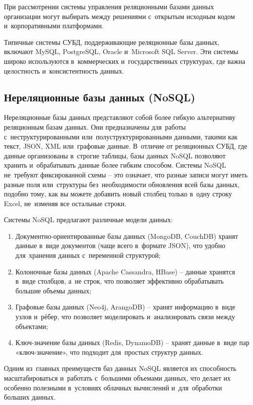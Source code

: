 \documentclass{ou}
\begin{document}
При рассмотрении системы управления реляционными базами данных организации могут выбирать между решениями с~открытым исходным кодом и~корпоративными платформами.

Типичные системы СУБД, поддерживающие реляционные базы данных, включают MySQL, PostgreSQL, Oracle и~Microsoft SQL Server. Эти системы широко используются в~коммерческих и~государственных структурах, где важна целостность и~консистентность данных.

\subsection{Нереляционные базы данных (NoSQL)}
Нереляционные базы данных представляют собой более гибкую альтернативу реляционным базам данных. Они предназначены для~работы с~неструктурированными или~полуструктурированными данными, такими как текст, JSON, XML или~графовые данные. В~отличие от реляционных СУБД, где данные организованы в~строгие таблицы, базы данных NoSQL позволяют хранить и~обрабатывать данные более гибким способом. Системы NoSQL не~требуют фиксированной схемы -- это означает, что разные записи могут иметь разные поля или~структуры без~необходимости обновления всей базы данных, подобно тому, как вы можете добавить новый столбец только в~одну строку Excel, не~изменяя все остальные строки.

Системы NoSQL предлагают различные модели данных: 
\begin{enumerate}[leftmargin=0em, itemindent=3.75em, nosep, label=\arabic*)]
\item Документно-ориентированные базы данных (MongoDB, CouchDB) хранят данные в~виде документов (чаще всего в~формате JSON), что удобно для~хранения данных с~переменной структурой;
\item Колоночные базы данных (Apache Cassandra, HBase) -- данные хранятся в~виде столбцов, а~не строк, что позволяет эффективно обрабатывать большие объемы данных;
\item Графовые базы данных (Neo4j, ArangoDB) -- хранят информацию в~виде узлов и~рёбер, что позволяет моделировать и~анализировать связи между объектами;
\item Ключ-значение базы данных (Redis, DynamoDB) -- хранят данные в~виде пар «ключ-значение», что подходит для~простых структур данных.
\end{enumerate}

Одним из~главных преимуществ баз данных NoSQL является их способность масштабироваться и~работать с~большими объемами данных, что делает их особенно полезными в~условиях облачных вычислений и~для~обработки больших данных.
\end{document}
